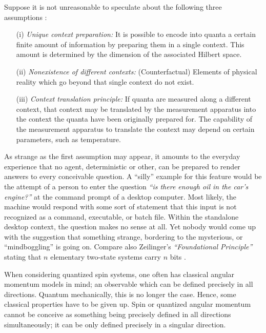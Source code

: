 \documentclass{aipproc}
\begin{document}
Suppose it is not unreasonable to
speculate about the following three assumptions \cite{svozil-2003-garda}:
\begin{itemize}
\item[(i)] {\em Unique context preparation:}
It is possible to encode into quanta
a certain finite amount of information by preparing them in a single context.
This amount is determined by the dimension of the associated Hilbert space.
\item[(ii)] {\em Nonexistence of different contexts:}
(Counterfactual) Elements of physical reality which go beyond that single context
do not exist.
\item[(iii)] {\em Context translation principle:}
If quanta are measured along a different context,
that context may be translated by the measurement apparatus
into the context the quanta have been originally prepared for.
The capability of the measurement apparatus to translate the context
may depend on certain parameters, such as temperature.
\end{itemize}

As strange as the first assumption may appear,
it amounts to the everyday experience
that no agent, deterministic or other,
can be prepared to render answers to every conceivable question.
A ``silly'' example for this feature would be the attempt of a person
to enter the question
{\em ``is there enough oil in the car's engine?''} at
the command prompt of a desktop computer.
Most likely, the machine would respond with some sort of
statement that this input is not recognized as a command,
executable, or batch file.
Within the standalone desktop context, the question makes no sense at all.
Yet nobody would come up with the suggestion that something strange,
bordering to the mysterious, or ``mindboggling'' is going on.
Compare also Zeilinger's {\em ``Foundational Principle''}
stating that $n$ elementary two-state systems carry $n$ bits \cite{zeil-99,zeil-bruk-02}.

When considering quantized spin systems, one often has classical angular momentum models in mind;
an observable which can be defined precisely in all directions.
Quantum mechanically, this is no longer the case.
Hence, some classical properties have to be given up.
Spin or quantized angular momentum cannot be conceive as something
being precisely defined in all directions simultaneously;
it can be only defined precisely in a singular direction.
\end{document}
